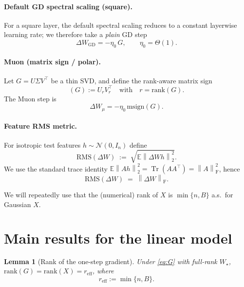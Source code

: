 \documentclass[11pt]{article}
\newtheorem{lemma}{Lemma}
\theoremstyle{definition}
\DeclareMathOperator{\Tr}{Tr}
\newcommand{\fro}{\mathrm{F}}
\newcommand{\E}{\mathbb{E}}
\newcommand{\msgn}{\mathrm{msign}}
\newcommand{\norm}[1]{\left\lVert#1\right\rVert}
\begin{document}
\paragraph{Default GD spectral scaling (square).} For a square layer, the default spectral scaling reduces to a constant layerwise learning rate; we therefore take a \emph{plain} GD step
\begin{equation}\label{eq:GDstep}
\Delta W_{\mathrm{GD}} = -\eta_0\, G, \qquad \eta_0=\Theta(1).
\end{equation}

\paragraph{Muon (matrix sign / polar).} Let $G=U\Sigma V^\top$ be a thin SVD, and define the rank-aware matrix sign
\begin{equation}\label{eq:Muon}
(G):=U_r V_r^\top \quad\text{with}\quad r=\mathrm{rank}(G).
\end{equation}
The Muon step is
\begin{equation}\label{eq:Muonstep}
\Delta W_\mu = -\eta_0\,\msgn(G).
\end{equation}

\paragraph{Feature RMS metric.} For isotropic test features $h\sim\mathcal N(0,I_n)$ define
\[
\mathrm{RMS}(\Delta W)\;:=\;\sqrt{\E \norm{\Delta W h}_2^2}.
\]
We use the standard trace identity $\E\norm{Ah}_2^2=\Tr(A A^\top)=\norm{A}_\fro^2$, hence
\begin{equation}\label{eq:RMS}
\mathrm{RMS}(\Delta W) \;=\; \norm{\Delta W}_\fro.
\end{equation}

We will repeatedly use that the (numerical) rank of $X$ is $\min\{n,B\}$ a.s.\ for Gaussian $X$.

\section{Main results for the linear model}

\begin{lemma}[Rank of the one-step gradient]\label{lem:rankG}
Under \eqref{eq:G} with full-rank $W_\star$, $\mathrm{rank}(G)=\mathrm{rank}(X)=r_{\mathrm{eff}}$, where
\[
r_{\mathrm{eff}} := \min\{n,B\}.
\]
\end{lemma}
\end{document}
